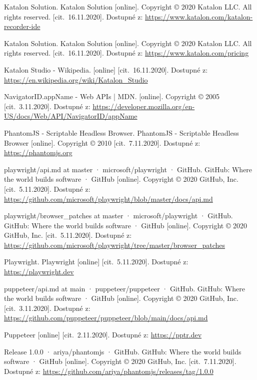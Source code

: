 \begin{thebibliography}{99}
 Katalon Solution. Katalon Solution [online]. Copyright © 2020 Katalon LLC. All rights reserved. [cit.~16.11.2020]. Dostupné z: \url{https://www.katalon.com/katalon-recorder-ide}

 Katalon Solution. Katalon Solution [online]. Copyright © 2020 Katalon LLC. All rights reserved. [cit.~16.11.2020]. Dostupné z: \url{https://www.katalon.com/pricing}

 Katalon Studio - Wikipedia. [online] [cit.~16.11.2020]. Dostupné z: \url{https://en.wikipedia.org/wiki/Katalon_Studio}

 NavigatorID.appName - Web APIs | MDN. [online]. Copyright © 2005 [cit.~3.11.2020]. Dostupné z: \url{https://developer.mozilla.org/en-US/docs/Web/API/NavigatorID/appName}

 PhantomJS - Scriptable Headless Browser. PhantomJS - Scriptable Headless Browser [online]. Copyright © 2010 [cit.~7.11.2020]. Dostupné z: \url{https://phantomjs.org}

 playwright/api.md at master · microsoft/playwright · GitHub. GitHub: Where the world builds software · GitHub [online]. Copyright © 2020 GitHub, Inc. [cit.~5.11.2020]. Dostupné z: \url{https://github.com/microsoft/playwright/blob/master/docs/api.md}

 playwright/browser\_patches at master · microsoft/playwright · GitHub. GitHub: Where the world builds software · GitHub [online]. Copyright © 2020 GitHub, Inc. [cit.~5.11.2020]. Dostupné z: \url{https://github.com/microsoft/playwright/tree/master/browser_patches}

 Playwright. Playwright [online] [cit.~5.11.2020]. Dostupné z: \url{https://playwright.dev}

 puppeteer/api.md at main · puppeteer/puppeteer · GitHub. GitHub: Where the world builds software · GitHub [online]. Copyright © 2020 GitHub, Inc. [cit.~3.11.2020]. Dostupné z: \url{https://github.com/puppeteer/puppeteer/blob/main/docs/api.md}

 Puppeteer [online] [cit.~2.11.2020]. Dostupné z: \url{https://pptr.dev}

 Release 1.0.0 · ariya/phantomjs · GitHub. GitHub: Where the world builds software · GitHub [online]. Copyright © 2020 GitHub, Inc. [cit.~7.11.2020]. Dostupné z: \url{https://github.com/ariya/phantomjs/releases/tag/1.0.0}


\end{thebibliography}
